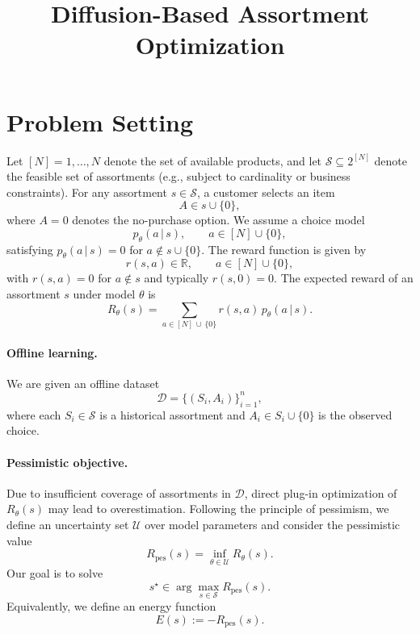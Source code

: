 \documentclass[11pt]{article}
\title{\bf Diffusion-Based Assortment Optimization}
\author{}
\date{}
\begin{document}
\maketitle
\section{Problem Setting}

Let $[N] = {1,\dots,N}$ denote the set of available products, and let $\mathscr{S} \subseteq 2^{[N]}$ denote the feasible set of assortments (e.g., subject to cardinality or business constraints). For any assortment $s \in \mathscr{S}$, a customer selects an item
\begin{equation*}
A \in s \cup \{0\},
\end{equation*}
where $A=0$ denotes the no-purchase option. We assume a choice model
\begin{equation*}
p_\theta(a\,|\, s), \qquad a \in [N]\cup\{0\},
\end{equation*}
satisfying $p_\theta(a\,|\, s)=0$ for $a \notin s \cup\{0\}$. The reward function is given by
\begin{equation*}
r(s,a) \in \mathbb{R}, \qquad a \in [N]\cup\{0\},
\end{equation*}
with $r(s,a)=0$ for $a \notin s$ and typically $r(s,0)=0$. The expected reward of an assortment $s$ under model $\theta$ is
\begin{equation*}
R_\theta(s)=\sum_{a \in [N]\,\cup\,\{0\}} r(s,a)\, p_\theta(a\,|\,s).
\end{equation*}

\paragraph{Offline learning.} \citep{wang2023neural, dong2025pasta, han2025learning}
We are given an offline dataset
\begin{equation*}
\mathcal{D} = \{(S_i, A_i)\}_{i=1}^n,
\end{equation*}
where each $S_i \in \mathscr{S}$ is a historical assortment and $A_i \in S_i \cup\{0\}$ is the observed choice.

\paragraph{Pessimistic objective.}
Due to insufficient coverage of assortments in $\mathcal{D}$, direct plug-in optimization of $R_\theta(s)$ may lead to overestimation. Following the principle of pessimism, we define an uncertainty set $\mathcal{U}$ over model parameters and consider the pessimistic value
\begin{equation*}
R_{\mathrm{pes}}(s)=\inf_{\theta \in \mathcal{U}} R_\theta(s).
\end{equation*}
Our goal is to solve
\begin{equation*}
s^\star \in \arg\max_{s \in \mathscr{S}} R_{\mathrm{pes}}(s).
\end{equation*}
Equivalently, we define an energy function
\begin{equation*}
E(s) := - R_{\mathrm{pes}}(s).
\end{equation*}
\end{document}
